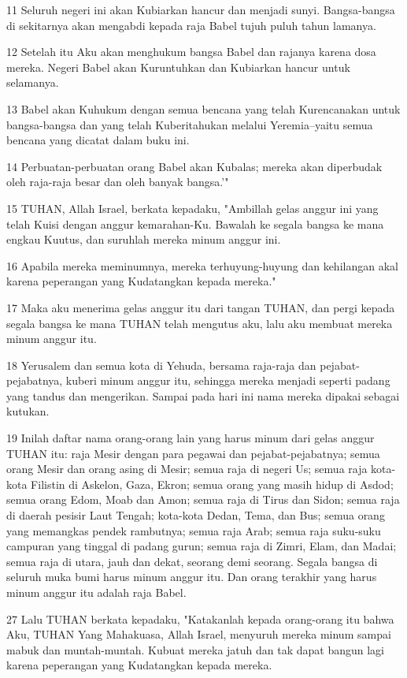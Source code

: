 \par 11 Seluruh negeri ini akan Kubiarkan hancur dan menjadi sunyi. Bangsa-bangsa di sekitarnya akan mengabdi kepada raja Babel tujuh puluh tahun lamanya.
\par 12 Setelah itu Aku akan menghukum bangsa Babel dan rajanya karena dosa mereka. Negeri Babel akan Kuruntuhkan dan Kubiarkan hancur untuk selamanya.
\par 13 Babel akan Kuhukum dengan semua bencana yang telah Kurencanakan untuk bangsa-bangsa dan yang telah Kuberitahukan melalui Yeremia--yaitu semua bencana yang dicatat dalam buku ini.
\par 14 Perbuatan-perbuatan orang Babel akan Kubalas; mereka akan diperbudak oleh raja-raja besar dan oleh banyak bangsa.'"
\par 15 TUHAN, Allah Israel, berkata kepadaku, "Ambillah gelas anggur ini yang telah Kuisi dengan anggur kemarahan-Ku. Bawalah ke segala bangsa ke mana engkau Kuutus, dan suruhlah mereka minum anggur ini.
\par 16 Apabila mereka meminumnya, mereka terhuyung-huyung dan kehilangan akal karena peperangan yang Kudatangkan kepada mereka."
\par 17 Maka aku menerima gelas anggur itu dari tangan TUHAN, dan pergi kepada segala bangsa ke mana TUHAN telah mengutus aku, lalu aku membuat mereka minum anggur itu.
\par 18 Yerusalem dan semua kota di Yehuda, bersama raja-raja dan pejabat-pejabatnya, kuberi minum anggur itu, sehingga mereka menjadi seperti padang yang tandus dan mengerikan. Sampai pada hari ini nama mereka dipakai sebagai kutukan.
\par 19 Inilah daftar nama orang-orang lain yang harus minum dari gelas anggur TUHAN itu: raja Mesir dengan para pegawai dan pejabat-pejabatnya; semua orang Mesir dan orang asing di Mesir; semua raja di negeri Us; semua raja kota-kota Filistin di Askelon, Gaza, Ekron; semua orang yang masih hidup di Asdod; semua orang Edom, Moab dan Amon; semua raja di Tirus dan Sidon; semua raja di daerah pesisir Laut Tengah; kota-kota Dedan, Tema, dan Bus; semua orang yang memangkas pendek rambutnya; semua raja Arab; semua raja suku-suku campuran yang tinggal di padang gurun; semua raja di Zimri, Elam, dan Madai; semua raja di utara, jauh dan dekat, seorang demi seorang. Segala bangsa di seluruh muka bumi harus minum anggur itu. Dan orang terakhir yang harus minum anggur itu adalah raja Babel.
\par 27 Lalu TUHAN berkata kepadaku, "Katakanlah kepada orang-orang itu bahwa Aku, TUHAN Yang Mahakuasa, Allah Israel, menyuruh mereka minum sampai mabuk dan muntah-muntah. Kubuat mereka jatuh dan tak dapat bangun lagi karena peperangan yang Kudatangkan kepada mereka.
